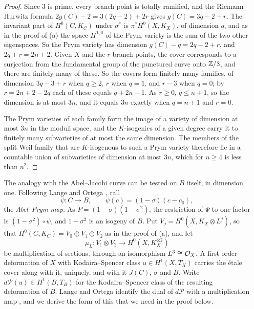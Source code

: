 \begin{proof}
Since $3$ is prime, every branch point is totally ramified, and the
Riemann--Hurwitz formula $2g(C)-2=3(2q-2)+2r$ gives $g(C)=3q-2+r$. The
invariant part of $H^{0}(C,K_{C})$ under $\sigma^{*}$ is
$\pi^{*}H^{0}(X,K_{X})$, of dimension $q$, and as in the proof of
(a) the space $H^{1,0}$ of the Prym variety is the sum of the
two other eigenspaces. So the Prym variety has dimension $g(C)-q=2q-2+r$,
and $2q+r=2n+2$. Given $X$ and the $r$ branch points, the cover corresponds
to a surjection from the fundamental group of the punctured curve onto
$\mathbb{Z}/3$, and there are finitely many of these. So the covers form finitely
many families, of dimension $3q-3+r$ when $q\ge2$, $r$ when $q=1$, and
$r-3$ when $q=0$; by $r=2n+2-2q$ each of these equals $q+2n-1$. As $r\ge0$,
$q\le n+1$, so the dimension is at most $3n$, and it equals $3n$ exactly
when $q=n+1$ and $r=0$.

The Prym varieties of each family form the image of a variety of
dimension at most $3n$ in the moduli space, and the $K$-isogenies of a given
degree carry it to finitely many subvarieties of at most the same
dimension. The members of the split
Weil family that are $K$-isogenous to such a Prym variety therefore lie in a
countable union of subvarieties of dimension at most $3n$, which for
$n\ge4$ is less than $n^{2}$.
\end{proof}

The analogy with the Abel--Jacobi curve can be tested on $B$ itself, in
dimension one. Following Lange and Ortega \cite{LO11}, call
\[
  \psi\colon C\to B,\qquad \psi(c)=(1-\sigma)(c-c_{0}),
\]
the \emph{Abel--Prym map}. As $P=(1-\sigma)(1-\sigma^{2})$, the restriction
of $\Psi$ to one factor is $(1-\sigma^{2})\circ\psi$, and $1-\sigma^{2}$ is
an isogeny of $B$. Put $V_{j}=H^{0}(X,K_{X}\otimes L^{j})$, so that
$H^{0}(C,K_{C})=V_{0}\oplus V_{1}\oplus V_{2}$ as in the proof of
(a), and let
\[
  \mu_{L}\colon V_{1}\otimes V_{2}\longrightarrow H^{0}(X,K_{X}^{\otimes2})
\]
be multiplication of sections, through an isomorphism $L^{3}\cong\mathcal{O}_{X}$.
A first-order deformation of $X$ with Kodaira--Spencer class $u\in
H^{1}(X,T_{X})$ carries the \'etale cover along with it, uniquely, and with
it $J(C)$, $\sigma$ and $B$. Write $d\mathcal{P}(u)\in H^{1}(B,T_{B})$ for the
Kodaira--Spencer class of the resulting deformation of $B$. Lange and Ortega
identify the dual of $d\mathcal{P}$ with a multiplication map
\cite{LO11}, and we derive the form of this that we need in the proof
below.


